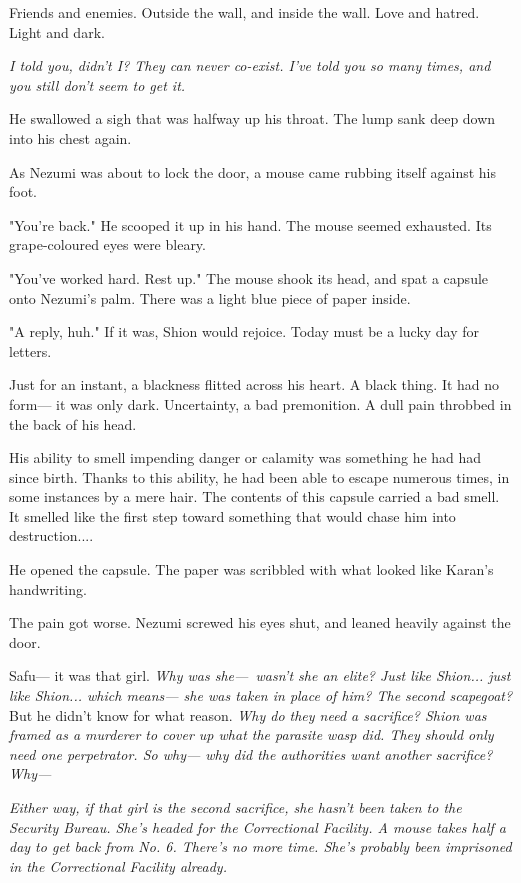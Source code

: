 Friends and enemies. Outside the wall, and inside the wall. Love and
hatred. Light and dark.

\emph{I told you, didn't I? They can never co-exist. I've told you so many
times, and you still don't seem to get it.}

He swallowed a sigh that was halfway up his throat. The lump sank deep
down into his chest again.

As Nezumi was about to lock the door, a mouse came rubbing itself
against his foot.

"You're back." He scooped it up in his hand. The mouse seemed exhausted.
Its grape-coloured eyes were bleary.

"You've worked hard. Rest up." The mouse shook its head, and spat a
capsule onto Nezumi's palm. There was a light blue piece of paper
inside.

"A reply, huh." If it was, Shion would rejoice. Today must be a lucky
day for letters.

Just for an instant, a blackness flitted across his heart. A black
thing. It had no form--- it was only dark. Uncertainty, a bad premonition.
A dull pain throbbed in the back of his head.

His ability to smell impending danger or calamity was something he had
had since birth. Thanks to this ability, he had been able to escape
numerous times, in some instances by a mere hair. The contents of this
capsule carried a bad smell. It smelled like the first step toward
something that would chase him into destruction....

He opened the capsule. The paper was scribbled with what looked like
Karan's handwriting.


The pain got worse. Nezumi screwed his eyes shut, and leaned heavily
against the door.

Safu--- it was that girl. \emph{Why was she---~wasn't she an elite? Just like
Shion... just like Shion... which means--- she was taken in place of him?
The second scapegoat?} But he didn't know for what reason. \emph{Why do they
need a sacrifice? Shion was framed as a murderer to cover up what the
parasite wasp did. They should only need one perpetrator. So why--- why
did the authorities want another sacrifice? Why---}

\emph{Either way, if that girl is the second sacrifice, she hasn't been taken
to the Security Bureau. She's headed for the Correctional Facility. A
mouse takes half a day to get back from No. 6. There's no more time.
She's probably been imprisoned in the Correctional Facility already.}

